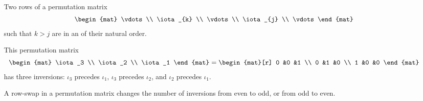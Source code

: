 \begin{definition}
Two rows of a permutation matrix
\begin{equation*}
  \begin{mat}
    \vdots          \\
    \iota_{k} \\
    \vdots          \\
    \iota_{j} \\
    \vdots
  \end{mat}
\end{equation*}
such that \( k>j \) are in an %
of their natural order.
\end{definition}

\begin{example}
This permutation matrix
\begin{equation*}
  \begin{mat}
    \iota_3  \\
    \iota_2  \\
    \iota_1
  \end{mat}
  =
  \begin{mat}[r]
    0  &0  &1  \\
    0  &1  &0  \\
    1  &0  &0
  \end{mat}
\end{equation*}
has three inversions: \( \iota_3 \) precedes \( \iota_1 \),
\( \iota_3 \) precedes \( \iota_2 \), and \( \iota_2 \) precedes
\( \iota_1 \).
\end{example}

\begin{lemma} \label{le:SwapsChangeSgn}
A row-swap in a permutation matrix changes the number of 
inversions from even to odd, or from odd to even.
\end{lemma}

